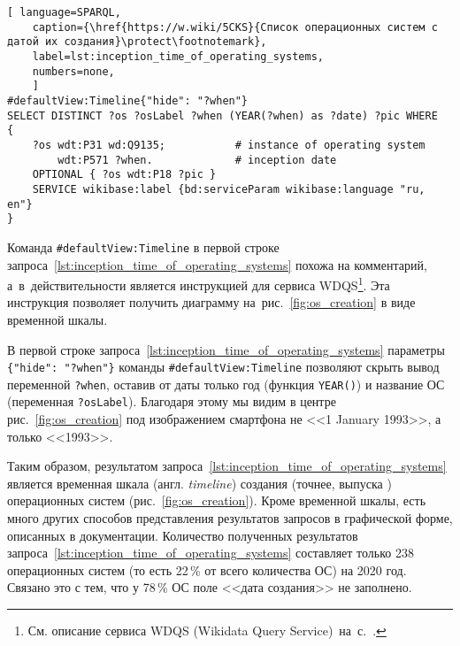 \begin{lstlisting}[ language=SPARQL, 
	caption={\href{https://w.wiki/5CKS}{Список операционных систем с датой их создания}\protect\footnotemark},
	label=lst:inception_time_of_operating_systems,
    numbers=none,
	]
#defaultView:Timeline{"hide": "?when"}
SELECT DISTINCT ?os ?osLabel ?when (YEAR(?when) as ?date) ?pic WHERE
{
    ?os wdt:P31 wd:Q9135;           # instance of operating system
        wdt:P571 ?when.             # inception date
    OPTIONAL { ?os wdt:P18 ?pic }
    SERVICE wikibase:label {bd:serviceParam wikibase:language "ru, en"}
}
\end{lstlisting}


\newpage
Команда \lstinline|#defaultView:Timeline| в первой строке 
запроса~\ref{lst:inception_time_of_operating_systems} 
похожа на комментарий, 
а~в~действительности является инструкцией для сервиса WDQS\footnote{%
    См. описание сервиса WDQS (Wikidata Query Service)~на~с.~\pageref{sect:WDQS}.%
}. 
Эта инструкция позволяет получить диаграмму на~рис.~\ref{fig:os_creation} 
в виде временной шкалы.

В первой строке запроса~\ref{lst:inception_time_of_operating_systems} 
параметры \lstinline|{"hide": "?when"}| 
команды \lstinline|#defaultView:Timeline| позволяют скрыть вывод переменной \lstinline|?when|, 
оставив от даты только год (функция \lstinline|YEAR()|) 
и название ОС (переменная \lstinline|?osLabel|). 
Благодаря этому мы видим в центре рис.~\ref{fig:os_creation} 
под изображением смартфона не <<1 January 1993>>, а только <<1993>>. 

Таким образом, результатом запроса~\ref{lst:inception_time_of_operating_systems} 
является временная шкала (англ. \textit{timeline}) создания (точнее, выпуска%
) %
операционных систем (рис.~\ref{fig:os_creation}). 
Кроме временной шкалы, есть много других способов представления результатов запросов 
в графической форме, описанных в документации\autocite{WQSResultViews}. 
Количество полученных результатов запроса~\ref{lst:inception_time_of_operating_systems} 
составляет только 238 операционных систем (то есть 22\,\% от всего количества ОС) на 2020 год. 
Связано это с тем, что у 78\,\% ОС поле <<дата создания>> не заполнено.

